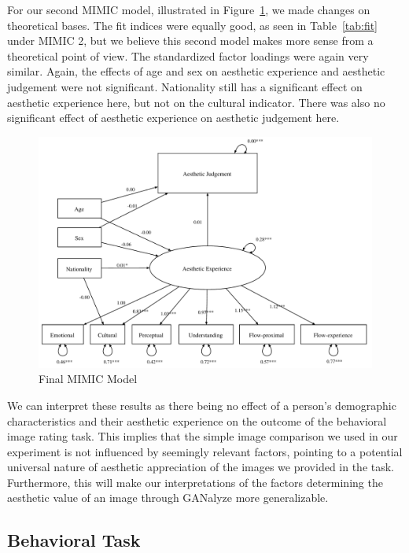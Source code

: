 \documentclass[../main.tex]{subfiles}
\begin{document}
	For our second MIMIC model, illustrated in Figure~\ref{fig:finalmodel}, we made changes on theoretical bases. The fit indices were equally good, as seen in Table~\ref{tab:fit} under MIMIC 2, but we believe this second model makes more sense from a theoretical point of view. The standardized factor loadings were again very similar. Again, the effects of age and sex on aesthetic experience and aesthetic judgement were not significant. Nationality still has a significant effect on aesthetic experience here, but not on the cultural indicator. There was also no significant effect of aesthetic experience on aesthetic judgement here.

	\begin{figure}[t]
		\caption{Final MIMIC Model}
		\label{fig:finalmodel}
		\includegraphics[width=1\linewidth]{images/model3.pdf}
	\end{figure}

	We can interpret these results as there being no effect of a person's demographic characteristics and their aesthetic experience on the outcome of the behavioral image rating task. This implies that the simple image comparison we used in our experiment is not influenced by seemingly relevant factors, pointing to a potential universal nature of aesthetic appreciation of the images we provided in the task. Furthermore, this will make our interpretations of the factors determining the aesthetic value of an image through GANalyze more generalizable.
	


	\subsection{Behavioral Task}
\end{document}
